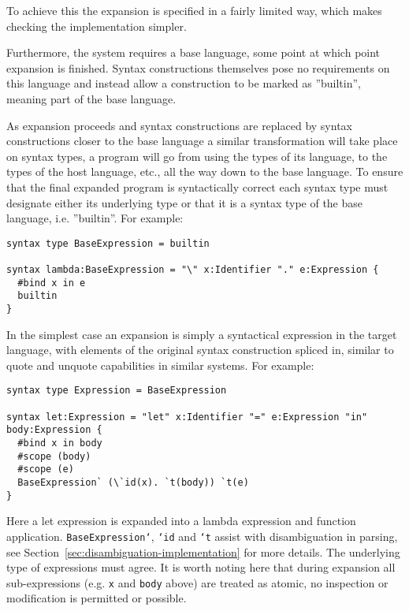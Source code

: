 \documentclass{kththesis}
\begin{document}
To achieve this the expansion is specified in a fairly limited way, which makes checking the implementation simpler.

Furthermore, the system requires a base language, some point at which point expansion is finished. Syntax constructions themselves pose no requirements on this language and instead allow a construction to be marked as ''builtin'', meaning part of the base language.

As expansion proceeds and syntax constructions are replaced by syntax constructions closer to the base language a similar transformation will take place on syntax types, a program will go from using the types of its language, to the types of the host language, etc., all the way down to the base language. To ensure that the final expanded program is syntactically correct each syntax type must designate either its underlying type or that it is a syntax type of the base language, i.e. ''builtin''. For example:

\begin{verbatim}
syntax type BaseExpression = builtin

syntax lambda:BaseExpression = "\" x:Identifier "." e:Expression {
  #bind x in e
  builtin
}
\end{verbatim}

In the simplest case an expansion is simply a syntactical expression in the target language, with elements of the original syntax construction spliced in, similar to quote and unquote capabilities in similar systems. For example:

\begin{verbatim}
syntax type Expression = BaseExpression

syntax let:Expression = "let" x:Identifier "=" e:Expression "in" body:Expression {
  #bind x in body
  #scope (body)
  #scope (e)
  BaseExpression` (\`id(x). `t(body)) `t(e)
}
\end{verbatim}

Here a let expression is expanded into a lambda expression and function application. \texttt{BaseExpression`}, \texttt{`id} and \texttt{`t} assist with disambiguation in parsing, see Section~\ref{sec:disambiguation-implementation} for more details. The underlying type of expressions must agree. It is worth noting here that during expansion all sub-expressions (e.g. \texttt{x} and \texttt{body} above) are treated as atomic, no inspection or modification is permitted or possible.
\end{document}
